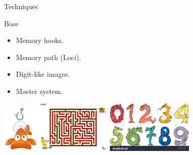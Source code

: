 \begin{frame}{Techniques}
  \begin{block}{Base}
    \begin{itemize}
      \item Memory hooks. 
      \item Memory path (Loci). 
      \item Digit-like images. 
      \item Master system.
    \end{itemize}
  \end{block}
  \begin{center}
    \includegraphics[height=2.5cm]{img/hook.jpg}
    \includegraphics[height=2.5cm]{img/path.jpg}
    \includegraphics[height=2.5cm]{img/digits.jpg}
  \end{center}
\end{frame}

